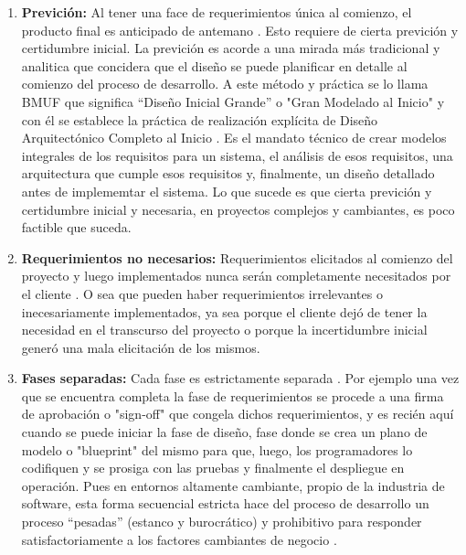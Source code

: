 \begin{enumerate}

\item \textbf{Previción:} Al tener una face de requerimientos única al comienzo, el producto final es anticipado de antemano \cite{Scrum-Institute-2015}. Esto requiere de cierta previción y certidumbre inicial. La previción es acorde a una mirada más tradicional y analitica que concidera que el diseño se puede planificar en detalle al comienzo del proceso de desarrollo. A este método y práctica se lo llama BMUF que significa “Diseño Inicial Grande” o "Gran Modelado al Inicio" y con él se establece la práctica de realización explícita de Diseño Arquitectónico Completo al Inicio \cite{Wiley-Sons-2002}. Es el mandato técnico de crear modelos integrales de los requisitos para un sistema, el análisis de esos requisitos, una arquitectura que cumple esos requisitos y, finalmente, un diseño detallado antes de implememtar el sistema. Lo que sucede es que cierta previción y certidumbre inicial y necesaria, en proyectos complejos y cambiantes, es poco factible que suceda.

\item \textbf{Requerimientos no necesarios:} Requerimientos elicitados al comienzo del proyecto y luego implementados nunca serán completamente necesitados por el cliente \cite{Scrum-Institute-2015}. O sea que pueden haber requerimientos irrelevantes o inecesariamente implementados, ya sea porque el cliente dejó de tener la necesidad en el transcurso del proyecto o porque la incertidumbre inicial generó una mala elicitación de los mismos.

\item \textbf{Fases separadas:} Cada fase es estrictamente separada \cite{Scrum-Institute-2015}. Por ejemplo una vez que se encuentra completa la fase de requerimientos se procede a una firma de aprobación o "sign-off" que congela dichos requerimientos, y es recién aquí cuando se puede iniciar la fase de diseño, fase donde se crea un plano de modelo o "blueprint" del mismo para que, luego, los programadores lo codifiquen y se prosiga con las pruebas y finalmente el despliegue en operación. Pues en entornos altamente cambiante, propio de la industria de software, esta forma secuencial estricta hace del proceso de desarrollo un proceso “pesadas” (estanco y burocrático) y prohibitivo para responder satisfactoriamente a los factores cambiantes de negocio \cite{Martin-Alaimo-2014}.

\end{enumerate}

